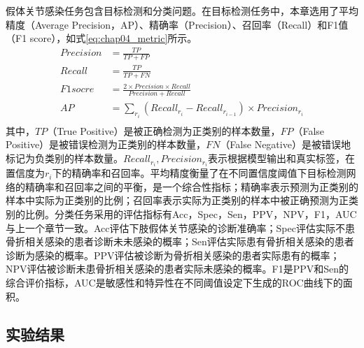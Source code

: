 假体关节感染任务包含目标检测和分类问题。在目标检测任务中，本章选用了平均精度（Average Precision，AP）、精确率（Precision）、召回率（Recall）和F1值（F1 score），如式\ref{eq:chap04_metric}所示。
\begin{equation}
  \begin{aligned}
    Precision & = \frac{TP}{TP+FP}                                                   \\
    Recall    & = \frac{TP}{TP+FN}                                                   \\
    F1 socre  & = \frac{2 \times Precision \times Recall}{Precision + Recall}        \\
    AP        & = \sum_{r_i}(Recall_{r_i} - Recall_{r_{i-1}}) \times Precision_{r_i} \\
  \end{aligned}
  \label{eq:chap04_metric}
\end{equation}
其中，\(TP\)（True Positive）是被正确检测为正类别的样本数量，\(FP\)（False Positive）是被错误检测为正类别的样本数量，\(FN\)（False Negative）是被错误地标记为负类别的样本数量。\(Recall_{r_i}, Precision_{r_i}\)表示根据模型输出和真实标签，在置信度为\(r_i\)下的精确率和召回率。平均精度衡量了在不同置信度阈值下目标检测网络的精确率和召回率之间的平衡，是一个综合性指标；精确率表示预测为正类别的样本中实际为正类别的比例；召回率表示实际为正类别的样本中被正确预测为正类别的比例。分类任务采用的评估指标有Acc，Spec，Sen，PPV，NPV，F1，AUC与上一个章节一致。Acc评估下肢假体关节感染的诊断准确率；Spec评估实际不患骨折相关感染的患者诊断未未感染的概率；Sen评估实际患有骨折相关感染的患者诊断为感染的概率。PPV评估被诊断为骨折相关感染的患者实际患有的概率；NPV评估被诊断未患骨折相关感染的患者实际未感染的概率。F1是PPV和Sen的综合评价指标，AUC是敏感性和特异性在不同阈值设定下生成的ROC曲线下的面积。

\subsection{实验结果}


